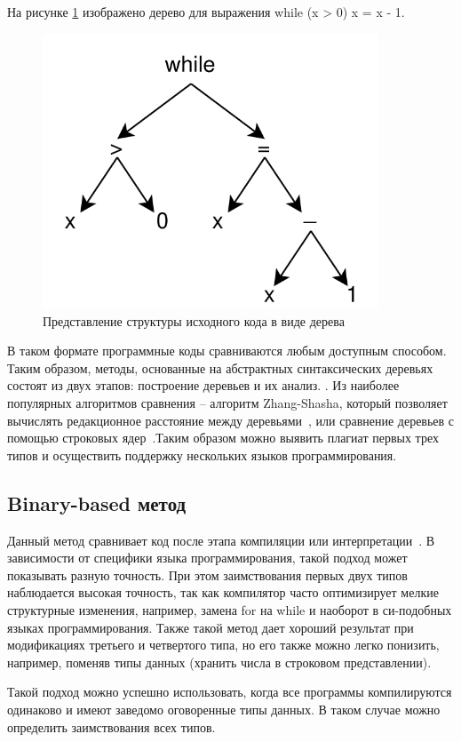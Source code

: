 На рисунке \ref{img:ast}  изображено дерево для выражения while (x > 0) x = x - 1.
\begin{figure}[!h]
	\centering
	\includegraphics[width=100mm]{img/ast2}
	\captionsetup{justification=centering}
	\centering\caption{Представление структуры исходного кода в виде дерева}
	\label{img:ast}
\end{figure}

В таком формате программные коды сравниваются любым доступным способом. Таким образом, методы, основанные на абстрактных синтаксических деревьях состоят из двух этапов: построение деревьев и их анализ. . Из наиболее популярных алгоритмов сравнения -- алгоритм Zhang-Shasha, который позволяет вычислять редакционное расстояние между деревьями~\cite{zhang}, или сравнение деревьев с помощью строковых ядер~\cite{kernel}.Таким образом можно выявить плагиат первых трех типов и осуществить поддержку нескольких языков программирования. 

\subsection{Binary-based метод}

Данный метод сравнивает код после этапа компиляции или интерпретации~\cite{binary}. В зависимости от специфики языка программирования, такой подход может показывать разную точность. При этом заимствования первых двух типов наблюдается высокая точность, так как компилятор часто оптимизирует мелкие структурные изменения, например, замена for на while и наоборот в си-подобных языках программирования. Также такой метод дает хороший результат при модификациях третьего и четвертого типа, но его также можно легко понизить, например, поменяв типы данных (хранить числа в строковом представлении).

Такой подход можно успешно использовать, когда все программы компилируются одинаково и  имеют заведомо оговоренные типы данных. В таком случае можно определить заимствования всех типов.
